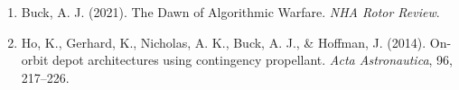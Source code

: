 \begin{enumerate}
  \item Buck, A. J. (2021). The Dawn of Algorithmic Warfare. \emph{NHA Rotor Review}.

  \item Ho, K., Gerhard, K., Nicholas, A. K., Buck, A. J., \& Hoffman, J. (2014).
    On-orbit depot architectures using contingency propellant.
    \emph{Acta Astronautica}, 96, 217--226.
\end{enumerate}
